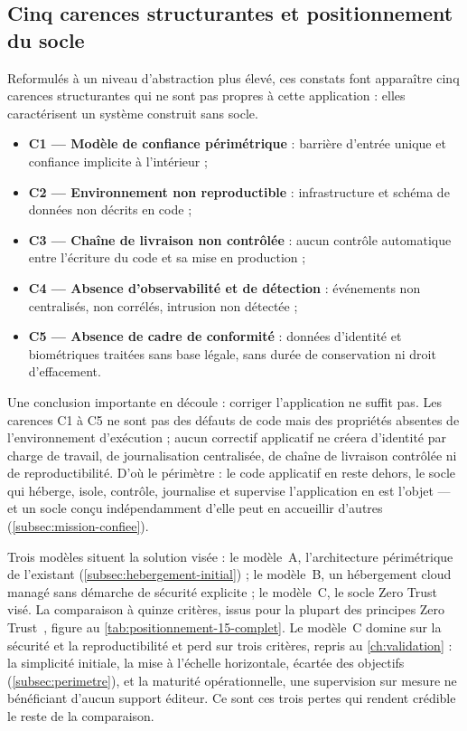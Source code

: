 \subsection{Cinq carences structurantes et positionnement du socle}
\label{subsec:carences-structurantes}
\label{subsec:distinction-appli-socle}
\label{subsec:positionnement-modeles}

Reformulés à un niveau d'abstraction plus élevé, ces constats font apparaître cinq carences
structurantes qui ne sont pas propres à cette application : elles caractérisent un système
construit sans socle.

\begin{itemize}\setlength{\itemsep}{1pt}
  \item \textbf{C1 --- Modèle de confiance périmétrique} : barrière d'entrée unique et confiance implicite à l'intérieur ;
  \item \textbf{C2 --- Environnement non reproductible} : infrastructure et schéma de données non décrits en code ;
  \item \textbf{C3 --- Chaîne de livraison non contrôlée} : aucun contrôle automatique entre l'écriture du code et sa mise en production ;
  \item \textbf{C4 --- Absence d'observabilité et de détection} : événements non centralisés, non corrélés, intrusion non détectée ;
  \item \textbf{C5 --- Absence de cadre de conformité} : données d'identité et biométriques traitées sans base légale, sans durée de conservation ni droit d'effacement.
\end{itemize}

Une conclusion importante en découle : corriger l'application ne suffit pas. Les carences C1 à C5
ne sont pas des défauts de code mais des propriétés absentes de l'environnement d'exécution ;
aucun correctif applicatif ne créera d'identité par charge de travail, de journalisation
centralisée, de chaîne de livraison contrôlée ni de reproductibilité. D'où le périmètre : le code
applicatif en reste dehors, le socle qui héberge, isole, contrôle, journalise et supervise
l'application en est l'objet --- et un socle conçu indépendamment d'elle peut en accueillir
d'autres (\cref{subsec:mission-confiee}).

Trois modèles situent la solution visée : le modèle~A, l'architecture périmétrique de l'existant
(\cref{subsec:hebergement-initial}) ; le modèle~B, un hébergement cloud managé sans démarche de
sécurité explicite ; le modèle~C, le socle Zero Trust visé. La comparaison à quinze critères,
issus pour la plupart des principes Zero Trust~\cite{nist800207}, figure au
\cref{tab:positionnement-15-complet}. Le modèle~C domine sur la sécurité et la reproductibilité
et perd sur trois critères, repris au \cref{ch:validation} : la simplicité initiale, la mise à
l'échelle horizontale, écartée des objectifs (\cref{subsec:perimetre}), et la maturité
opérationnelle, une supervision sur mesure ne bénéficiant d'aucun support éditeur. Ce sont ces
trois pertes qui rendent crédible le reste de la comparaison.

